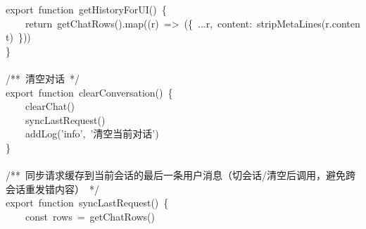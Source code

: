 \documentclass[a4paper,10pt]{article}
\begin{document}
{export~function~getHistoryForUI()~\{\\
~~~~return~getChatRows().map((r)~=>~(\{~...r,~content:~stripMetaLines(r.content)~\}))\\
\}\\
\mbox{}\\
/**~清空对话~*/\\
export~function~clearConversation()~\{\\
~~~~clearChat()\\
~~~~syncLastRequest()\\
~~~~addLog('info',~'清空当前对话')\\
\}\\
\mbox{}\\
/**~同步请求缓存到当前会话的最后一条用户消息（切会话/清空后调用，避免跨会话重发错内容）~*/\\
export~function~syncLastRequest()~\{\\
~~~~const~rows~=~getChatRows()
}

\newpage
\end{document}
